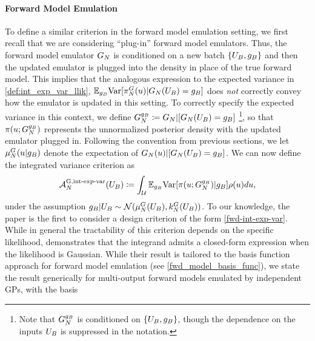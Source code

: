 \documentclass[12pt]{article}
\begin{document}
\paragraph{Forward Model Emulation}
To define a similar criterion in the forward model emulation setting, we first recall that we are considering ``plug-in'' forward model emulators. 
Thus, the forward model emulator $\fwdEm$ is conditioned on a new batch $\{\designBatchIn, \designBatchFwd\}$ and then 
the updated emulator is plugged into the density in place of the true forward model. This implies that the analogous expression to 
the expected variance in \ref{def:int_exp_var_llik}, 
$\E_{\designBatchFwd} \Var[\fwdEmRdm[\Ndesign]{\postDens}(\Par) | \fwdEm[\Ndesign](\designBatchIn) = \designBatchFwd]$
does \textit{not} correctly convey how the emulator is updated in this setting. To correctly specify the expected variance in this 
context, we define $\fwdEmCond{\designBatchFwd} \Def \fwdEm | [\fwdEm(\designBatchIn) = \designBatchFwd]$
\footnote{Note that $\fwdEmCond{\designBatchFwd}$ is conditioned on $\{\designBatchIn, \designBatchFwd\}$, though the 
dependence on the inputs $\designBatchIn$ is suppressed in the notation.}, so that 
$\postDens(\Par; \fwdEmCond{\designBatchFwd})$ represents the unnormalized posterior density 
with the updated emulator plugged in. Following the convention from previous sections, we let 
$\emMean[\Ndesign]{\fwd}(\Par | \designBatchFwd)$ denote the expectation of 
$\fwdEm(\Par) | [\fwdEm(\designBatchIn) = \designBatchFwd]$.
We can now define the integrated variance criterion as 
\begin{align}
\labelAcq[\Ndesign]{\fwdintExpVarLabel}(\designBatchIn) \Def
\int_{\parSpace} \E_{\designBatchFwd} \Var[\postDens(\Par; \fwdEmCond{\designBatchFwd}) | \designBatchFwd]\weightDens(\Par) d\Par, \label{fwd-int-exp-var}
\end{align}
under the assumption $\designBatchFwd|\designBatchIn \sim \Gaussian(\emMean{\fwd}(\designBatchIn), \emKer{\fwd}(\designBatchIn))$.
To our knowledge, 
the paper \cite{SinsbeckNowak} is the first to consider a design criterion of the form \ref{fwd-int-exp-var}. 
While in general the tractability of this criterion depends on the specific likelihood, \cite{Surer2023sequential} 
demonstrates that the integrand admits a closed-form expression when the likelihood is Gaussian. 
While their result is tailored to the basis function approach for forward model emulation (see \ref{fwd_model_basis_func}), 
we state the result generically for multi-output forward models emulated by independent GPs, with the basis 
\end{document}
